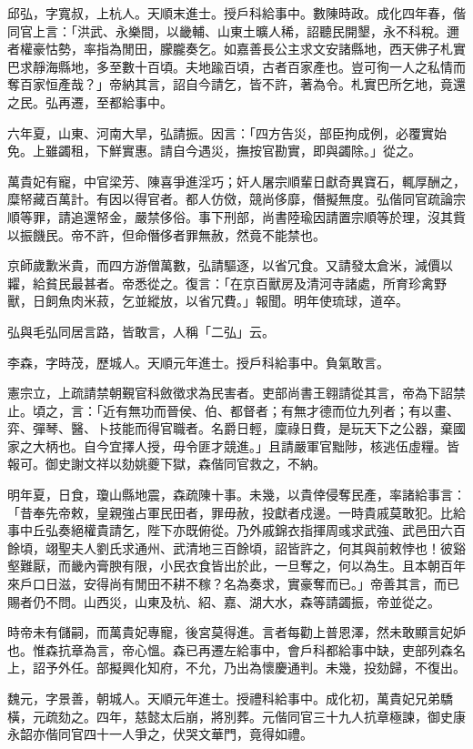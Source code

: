 \begin{pinyinscope}
邱弘，字寬叔，上杭人。天順末進士。授戶科給事中。數陳時政。成化四年春，偕同官上言：「洪武、永樂間，以畿輔、山東土曠人稀，詔聽民開墾，永不科稅。邇者權豪怙勢，率指為閒田，朦朧奏乞。如嘉善長公主求文安諸縣地，西天佛子札實巴求靜海縣地，多至數十百頃。夫地踰百頃，古者百家產也。豈可徇一人之私情而奪百家恒產哉？」帝納其言，詔自今請乞，皆不許，著為令。札實巴所乞地，竟還之民。弘再遷，至都給事中。

六年夏，山東、河南大旱，弘請振。因言：「四方告災，部臣拘成例，必覆實始免。上雖蠲租，下鮮實惠。請自今遇災，撫按官勘實，即與蠲除。」從之。

萬貴妃有寵，中官梁芳、陳喜爭進淫巧；奸人屠宗順輩日獻奇異寶石，輒厚酬之，糜帑藏百萬計。有因以得官者。都人仿傚，競尚侈靡，僭擬無度。弘偕同官疏論宗順等罪，請追還帑金，嚴禁侈俗。事下刑部，尚書陸瑜因請置宗順等於理，沒其貲以振饑民。帝不許，但命僭侈者罪無赦，然竟不能禁也。

京師歲歉米貴，而四方游僧萬數，弘請驅逐，以省冗食。又請發太倉米，減價以糶，給貧民最甚者。帝悉從之。復言：「在京百獸房及清河寺諸處，所育珍禽野獸，日飼魚肉米菽，乞並縱放，以省冗費。」報聞。明年使琉球，道卒。

弘與毛弘同居言路，皆敢言，人稱「二弘」云。

李森，字時茂，歷城人。天順元年進士。授戶科給事中。負氣敢言。

憲宗立，上疏請禁朝覲官科斂徵求為民害者。吏部尚書王翱請從其言，帝為下詔禁止。頃之，言：「近有無功而晉侯、伯、都督者；有無才德而位九列者；有以畫、弈、彈琴、醫、卜技能而得官職者。名爵日輕，廩祿日費，是玩天下之公器，棄國家之大柄也。自今宜擇人授，毋令匪才競進。」且請嚴軍官黜陟，核逃伍虛糧。皆報可。御史謝文祥以劾姚夔下獄，森偕同官救之，不納。

明年夏，日食，瓊山縣地震，森疏陳十事。未幾，以貴倖侵奪民產，率諸給事言：「昔奉先帝敕，皇親強占軍民田者，罪毋赦，投獻者戍邊。一時貴戚莫敢犯。比給事中丘弘奏絕權貴請乞，陛下亦既俯從。乃外戚錦衣指揮周彧求武強、武邑田六百餘頃，翊聖夫人劉氏求通州、武清地三百餘頃，詔皆許之，何其與前敕悖也！彼谿壑難厭，而畿內膏腴有限，小民衣食皆出於此，一旦奪之，何以為生。且本朝百年來戶口日滋，安得尚有閒田不耕不稼？名為奏求，實豪奪而已。」帝善其言，而已賜者仍不問。山西災，山東及杭、紹、嘉、湖大水，森等請蠲振，帝並從之。

時帝未有儲嗣，而萬貴妃專寵，後宮莫得進。言者每勸上普恩澤，然未敢顯言妃妒也。惟森抗章為言，帝心慍。森已再遷左給事中，會戶科都給事中缺，吏部列森名上，詔予外任。部擬興化知府，不允，乃出為懷慶通判。未幾，投劾歸，不復出。

魏元，字景善，朝城人。天順元年進士。授禮科給事中。成化初，萬貴妃兄弟驕橫，元疏劾之。四年，慈懿太后崩，將別葬。元偕同官三十九人抗章極諫，御史康永韶亦偕同官四十一人爭之，伏哭文華門，竟得如禮。


\end{pinyinscope}
